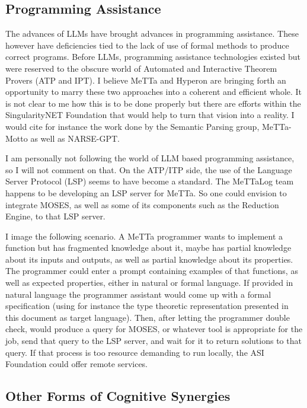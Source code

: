 \documentclass[]{report}
\begin{document}
\subsection{Programming Assistance}

The advances of LLMs have brought advances in programming assistance.
These however have deficiencies tied to the lack of use of formal
methods to produce correct programs.  Before LLMs, programming
assistance technologies existed but were reserved to the obscure world
of Automated and Interactive Theorem Provers (ATP and IPT).  I believe
MeTTa and Hyperon are bringing forth an opportunity to marry these two
approaches into a coherent and efficient whole.  It is not clear to me
how this is to be done properly but there are efforts within the
SingularityNET Foundation that would help to turn that vision into a
reality.  I would cite for instance the work done by the Semantic
Parsing group, MeTTa-Motto as well as NARSE-GPT.

I am personally not following the world of LLM based programming
assistance, so I will not comment on that.  On the ATP/ITP side, the
use of the Language Server Protocol (LSP) seems to have become a
standard.  The MeTTaLog team happens to be developing an LSP server
for MeTTa.  So one could envision to integrate MOSES, as well as some
of its components such as the Reduction Engine, to that LSP server.

I image the following scenario.  A MeTTa programmer wants to implement
a function but has fragmented knowledge about it, maybe has partial
knowledge about its inputs and outputs, as well as partial knowledge
about its properties.  The programmer could enter a prompt containing
examples of that functions, as well as expected properties, either in
natural or formal language.  If provided in natural language the
programmer assistant would come up with a formal specification (using
for instance the type theoretic representation presented in this
document as target language).  Then, after letting the programmer
double check, would produce a query for MOSES, or whatever tool is
appropriate for the job, send that query to the LSP server, and wait
for it to return solutions to that query.  If that process is too
resource demanding to run locally, the ASI Foundation could offer
remote services.

\subsection{Other Forms of Cognitive Synergies}
\end{document}
